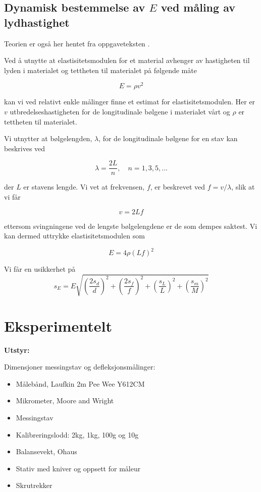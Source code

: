 \documentclass[a4paper,11pt, twocolumn]{article}
\begin{document}
\subsection{Dynamisk bestemmelse av $E$ ved måling av lydhastighet}
Teorien er også her hentet fra oppgaveteksten \cite{oppgavetekst}. 

Ved å utnytte at elastisitetsmodulen for et material avhenger av hastigheten til lyden i materialet og tettheten til materialet på følgende måte

\begin{equation}
	E = \rho v^2
	\label{eq:dynamiskElastisitet}
\end{equation}

kan vi ved relativt enkle målinger finne et estimat for elastisitetsmodulen. Her er $v$ utbredelseshastigheten for de longitudinale bølgene i materialet vårt og $\rho$ er tettheten til materialet.

Vi utnytter at bølgelengden, $\lambda$, for de longitudinale bølgene for en stav kan beskrives ved 

\begin{equation}
	\lambda = \frac{2L}{n}, \quad n = 1, 3, 5, \dots
\end{equation}

der $L$ er stavens lengde. Vi vet at frekvensen, $f$, er beskrevet ved $f = v/\lambda$, slik at vi får 

\begin{equation}
	v = 2Lf
\end{equation}

ettersom svingningene ved de lengste bølgelengdene er de som dempes saktest. Vi kan dermed uttrykke elastisitetsmodulen som

\begin{equation}
	E = 4\rho(Lf)^2
	\label{eq:dynEl}
\end{equation}

Vi får en usikkerhet på
\begin{equation}
	s_E = E\sqrt{\left(\frac{2s_d}{d}\right)^2+\left(\frac{2s_f}{f}\right)^2+\left(\frac{s_L}{L}\right)^2+\left(\frac{s_m}{M}\right)^2}	
	\label{eq:feilDynamisk}
\end{equation}

\section{Eksperimentelt}
{\bf Utstyr:}

Dimensjoner messingstav og defleksjonsmålinger:
\begin{itemize}
	\item Målebånd, Laufkin 2m Pee Wee Y612CM
	\item Mikrometer, Moore and Wright
	\item Messingstav
	\item Kalibreringslodd: 2kg, 1kg, 100g og 10g
	\item Balansevekt, Ohaus
	\item Stativ med kniver og oppsett for måleur
	\item Skrutrekker
\end{itemize}
\end{document}
